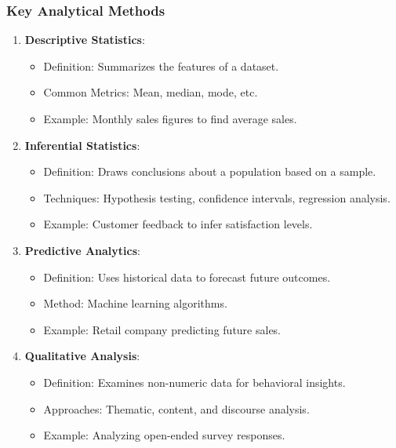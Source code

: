 \documentclass[aspectratio=169]{beamer}
\begin{document}
\begin{frame}
    \frametitle{Key Analytical Methods}
    \begin{enumerate}
        \item \textbf{Descriptive Statistics}:
        \begin{itemize}
            \item Definition: Summarizes the features of a dataset.
            \item Common Metrics: Mean, median, mode, etc.
            \item Example: Monthly sales figures to find average sales.
        \end{itemize}

        \item \textbf{Inferential Statistics}:
        \begin{itemize}
            \item Definition: Draws conclusions about a population based on a sample.
            \item Techniques: Hypothesis testing, confidence intervals, regression analysis.
            \item Example: Customer feedback to infer satisfaction levels.
        \end{itemize}

        \item \textbf{Predictive Analytics}:
        \begin{itemize}
            \item Definition: Uses historical data to forecast future outcomes.
            \item Method: Machine learning algorithms.
            \item Example: Retail company predicting future sales.
        \end{itemize}

        \item \textbf{Qualitative Analysis}:
        \begin{itemize}
            \item Definition: Examines non-numeric data for behavioral insights.
            \item Approaches: Thematic, content, and discourse analysis.
            \item Example: Analyzing open-ended survey responses.
        \end{itemize}
    \end{enumerate}
\end{frame}
\end{document}
